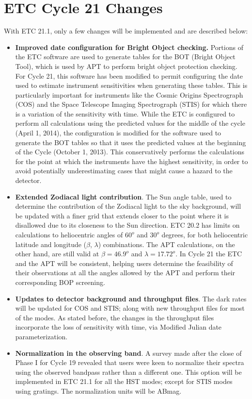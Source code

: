 \section{ETC Cycle 21 Changes}

With ETC 21.1, only a few changes will be implemented and are described below:

\begin{itemize}
\item {\bf{ Improved date configuration for Bright Object checking.}}
Portions of the ETC software are used to generate tables for the BOT (Bright Object Tool), which is used by APT to perform bright object protection checking. For Cycle 21, this software has been modified to permit configuring the date used to estimate instrument sensitivities when generating these tables.  This is particularly important for instruments like the Cosmic Origins Spectrograph (COS) and the Space Telescope Imaging Spectrograph (STIS) for which there is a variation of the sensitivity with time. While the ETC is configured to perform all calculations using the predicted values for the middle of the cycle (April 1, 2014), the configuration is modified for the software used to generate the BOT tables so that it uses the predicted values at the beginning of the Cycle (October 1, 2013). This conservatively performs the calculations for the point at which the instruments have the highest sensitivity, in order to avoid potentially underestimating cases that might cause a hazard to the detector.

\item {\bf { Extended Zodiacal light contribution}}.
The Sun angle table, used to determine the contribution of the  Zodiacal light to the sky background, will be updated with a finer grid that extends closer to  the point where it is disallowed due to its closeness to the Sun direction. ETC 20.2 has limits on calculations to heliocentric angles of $60^o$ and $30^o$ degrees, for both heliocentric latitude and longitude ($\beta$, $\lambda$) combinations. The APT calculations, on the other hand, are still valid at  $\beta = 46.9^o$ and $\lambda = 17.72^o$. In Cycle 21  the ETC and the APT will be consistent, helping users determine the feasibility of their observations at all the angles allowed by the APT and perform their corresponding BOP screening.

\item {\bf Updates to detector background and throughput files}.
The dark rates will be updated for COS and STIS;  along with new  throughput files for most of the modes. As stated before, the changes in the throughput files incorporate the loss of sensitivity with time, via Modified Julian date parameterization.

\item {\bf Normalization in the observing band}.
A survey made after the close of Phase I for Cycle 19 revealed that users were keen to normalize their spectra using the observed bandpass rather than a different one. This option will be implemented in ETC 21.1 for all the HST modes; except for STIS modes using gratings. The normalization units will be ABmag.


\end{itemize}

